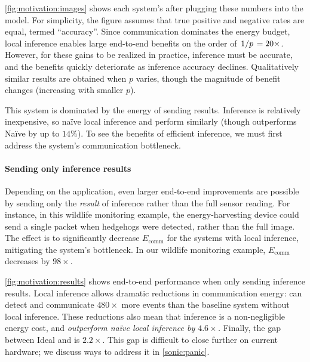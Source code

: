 \figSONICMotivateImages

\autoref{fig:motivation:images} shows each system's \metric after
plugging these numbers into the model.
%
For simplicity, the figure assumes that true positive and negative
rates are equal, termed ``accuracy''.
%
Since communication dominates the energy budget, local inference
enables large end-to-end benefits on the order of $\left.1\middle/p\right. = 20\times$.
%
However, for these gains to be realized in practice, inference must be
accurate, and the benefits quickly deteriorate as inference accuracy
declines.
%
Qualitatively similar results are obtained when $p$ varies, though the
magnitude of benefit changes (increasing with smaller $p$).

This system is dominated by the energy of sending results.
Inference is relatively inexpensive, so na\"ive local inference and \sonictails perform similarly
(though \sonictails outperforms Na\"ive by up to $14\%$).
To see the benefits of efficient inference, we must first address the system's communication bottleneck.

\paragraph{Sending only inference results}
%
Depending on the application, even larger end-to-end improvements are
possible by sending only the \emph{result} of inference rather than
the full sensor reading.
%
For instance, in this wildlife monitoring example, the
energy-harvesting device could send a single packet when hedgehogs
were detected, rather than the full image.
%
The effect is to significantly decrease $E_\text{comm}$
for the systems with local inference, mitigating the system's
bottleneck.
%
In our wildlife monitoring example, $E_\text{comm}$ decreases by $98\times$.

\figSONICMotivateResults

\autoref{fig:motivation:results} shows end-to-end performance when
only sending inference results.
%
Local inference allows dramatic reductions in communication energy:
\sonictails can detect and communicate $480\times$ more events than
the baseline system without local inference.
%
These reductions also mean that inference is a non-negligible
energy cost,
and \emph{\sonictails outperform na\"ive local inference by $4.6\times$.}
Finally, the gap between Ideal and \sonictails is $2.2\times$.
%
This gap is difficult to close further on current hardware;
we discuss ways to address it in \autoref{sonic:panic}.